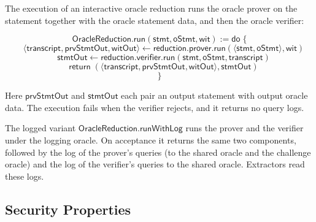 \begin{definition}
    \label{def:oracle_reduction_run}
    The execution of an interactive oracle reduction runs the oracle prover on the statement
    together with the oracle statement data, and then the oracle verifier:

    \begin{equation*} \mathsf{OracleReduction}.\mathsf{run}(\mathsf{stmt}, \mathsf{oStmt}, \mathsf{wit}) := \mathsf{do} \; \{ \end{equation*}
    \begin{equation*} \quad \langle \mathsf{transcript}, \mathsf{prvStmtOut}, \mathsf{witOut} \rangle \leftarrow \mathsf{reduction}.\mathsf{prover}.\mathsf{run}(\langle \mathsf{stmt}, \mathsf{oStmt} \rangle, \mathsf{wit}) \end{equation*}
    \begin{equation*} \quad \mathsf{stmtOut} \leftarrow \mathsf{reduction}.\mathsf{verifier}.\mathsf{run}(\mathsf{stmt}, \mathsf{oStmt}, \mathsf{transcript}) \end{equation*}
    \begin{equation*} \quad \mathsf{return} \; (\langle \mathsf{transcript}, \mathsf{prvStmtOut}, \mathsf{witOut} \rangle, \mathsf{stmtOut}) \end{equation*}
    \begin{equation*} \} \end{equation*}

    Here \(\mathsf{prvStmtOut}\) and \(\mathsf{stmtOut}\) each pair an output statement with output
    oracle data. The execution fails when the verifier rejects, and it returns no query logs.

    The logged variant \(\mathsf{OracleReduction}.\mathsf{runWithLog}\) runs the prover and the
    verifier under the logging oracle. On acceptance it returns the same two components, followed
    by the log of the prover's queries (to the shared oracle and the challenge oracle) and the
    log of the verifier's queries to the shared oracle. Extractors read these logs.
    \leanok
\end{definition}

\subsection{Security Properties}\label{sec:security}

